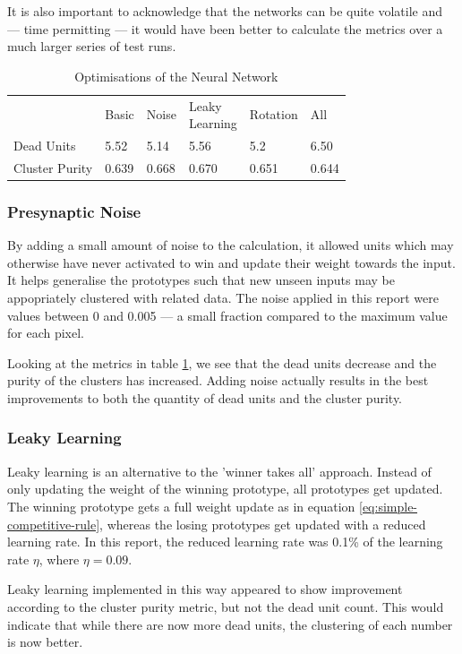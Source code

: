 \documentclass[11pt,journal,transmag,final]{IEEEtran}
\begin{document}
It is also important to acknowledge that the networks can be quite volatile and --- time permitting --- it would have been better to calculate the metrics over a much larger series of test runs.

\begin{table}
    \centering
    \caption{Optimisations of the Neural Network}
    \label{table:nn}
    \begin{tabular}{l|lllll}
    & Basic & Noise & \makecell{Leaky \\Learning} & Rotation & All \\
    Dead Units & 5.52 & 5.14 & 5.56 & 5.2 & 6.50 \\
    Cluster Purity & 0.639 & 0.668 & 0.670 & 0.651 & 0.644
    \end{tabular}
\end{table}

\subsubsection{Presynaptic Noise}

By adding a small amount of noise to the calculation, it allowed units which may otherwise have never activated to win and update their weight towards the input. It helps generalise the prototypes such that new unseen inputs may be appopriately clustered with related data. The noise applied in this report were values between 0 and 0.005 --- a small fraction compared to the maximum value for each pixel.

Looking at the metrics in table \ref{table:nn}, we see that the dead units decrease and the purity of the clusters has increased. Adding noise actually results in the best improvements to both the quantity of dead units and the cluster purity.

\subsubsection{Leaky Learning}

Leaky learning is an alternative to the 'winner takes all' approach. Instead of only updating the weight of the winning prototype, all prototypes get updated. The winning prototype gets a full weight update as in equation \ref{eq:simple-competitive-rule}, whereas the losing prototypes get updated with a reduced learning rate. In this report, the reduced learning rate was 0.1\% of the learning rate $\eta$, where $\eta = 0.09$.

Leaky learning implemented in this way appeared to show improvement according to the cluster purity metric, but not the dead unit count. This would indicate that while there are now more dead units, the clustering of each number is now better.
\end{document}

